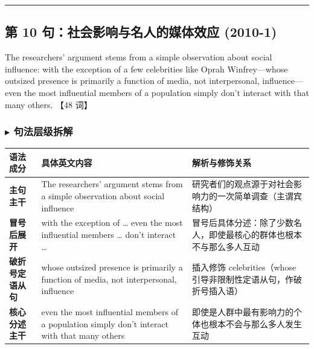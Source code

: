 \documentclass[cn,normal,11pt]{elegantnote}
\begin{document}
\par\vspace{10pt}\hrule\vspace{10pt}

\subsection{第 10 句：社会影响与名人的媒体效应 (2010-1)}

\begin{note}
  The researchers' argument stems from a simple observation about social influence: with the exception of a few celebrities like Oprah Winfrey—whose outsized presence is primarily a function of media, not interpersonal, influence—even the most influential members of a population simply don't interact with that many others. 【48 词】
\end{note}

\subsubsection*{$\blacktriangleright$ 句法层级拆解}
\noindent
\begin{tabularx}{\textwidth}{p{3.2cm} X X}
  \toprule
  \textbf{语法成分} & \textbf{具体英文内容} & \textbf{解析与修饰关系} \\
  \midrule
  \textbf{主句主干} & The researchers' argument stems from a simple observation about social influence & 研究者们的观点源于对社会影响力的一次简单调查（主谓宾结构） \\
  \midrule
  \textbf{冒号后展开} & with the exception of … even the most influential members … don't interact … & 冒号后具体分述：除了少数名人，即使最核心的群体也根本不与那么多人互动 \\
  \midrule
  \textbf{破折号定语从句} & whose outsized presence is primarily a function of media, not interpersonal, influence & 插入修饰 celebrities（whose 引导非限制性定语从句，作破折号插入语） \\
  \midrule
  \textbf{核心分述主干} & even the most influential members of a population simply don't interact with that many others & 即使是人群中最有影响力的个体也根本不会与那么多人发生互动 \\
  \bottomrule
\end{tabularx}
\end{document}

